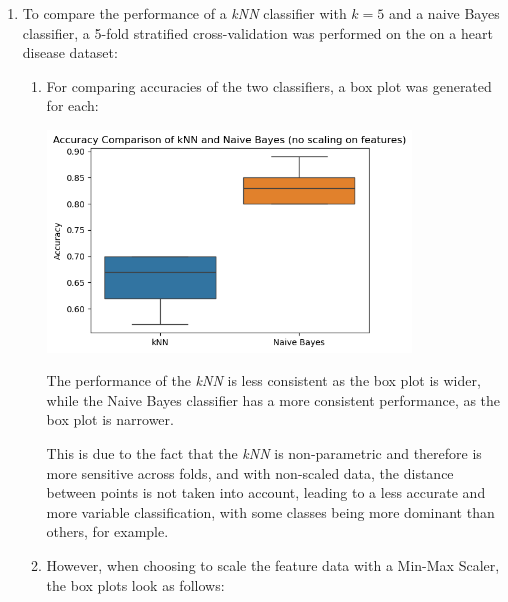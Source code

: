 \documentclass[12pt]{article}
\begin{document}
\begin{enumerate}[leftmargin=\labelsep, label=\textbf{\arabic*.)}]
    \item To compare the performance of a \textit{kNN} classifier with $k=5$ and a naive Bayes classifier, a 5-fold stratified cross-validation was performed on the on a heart disease dataset:

          \begin{enumerate}[label=\textbf{\alph*.)}]
              \item For comparing accuracies of the two classifiers, a box plot was generated for each:

                    \begin{center}
                        \includegraphics[width=0.8\textwidth]{boxplot_accuracies_unscaled.png}
                    \end{center}

                    The performance of the \textit{kNN} is less consistent as the box plot is wider, while the Naive Bayes classifier has a more consistent performance, as the box plot is narrower.

                    This is due to the fact that the \textit{kNN} is non-parametric and therefore is more sensitive across folds, and with non-scaled data, the distance between points is not taken into account, leading to a less accurate and more variable classification, with some classes being more dominant than others, for example.

              \item However, when choosing to scale the feature data with a Min-Max Scaler, the box plots look as follows:


\end{enumerate}
\end{enumerate}
\end{document}
